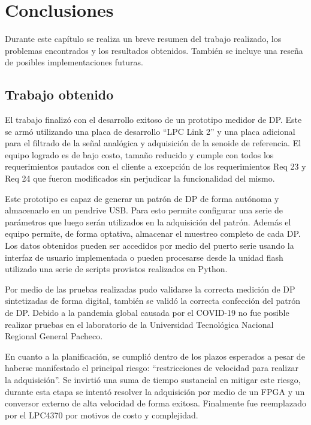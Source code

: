 
\chapter{Conclusiones} %

\label{Chapter5} %
Durante este capítulo se realiza un breve resumen del trabajo realizado, los problemas encontrados y los resultados obtenidos. También se incluye una reseña de posibles implementaciones futuras.

\section{Trabajo obtenido}

El trabajo finalizó con el desarrollo exitoso de un prototipo medidor de DP. Este se armó utilizando una placa de desarrollo “LPC Link 2” y una placa adicional para el filtrado de la señal analógica y adquisición de la senoide de referencia. El equipo logrado es de bajo costo, tamaño reducido y cumple con todos los requerimientos pautados con el cliente a excepción de los requerimientos Req 23 y Req 24 que fueron modificados sin perjudicar la funcionalidad del mismo.

Este prototipo es capaz de generar un patrón de DP de forma autónoma y almacenarlo en un pendrive USB. Para esto permite configurar una serie de parámetros que luego serán utilizados en la adquisición del patrón. Además el equipo permite, de forma optativa, almacenar el muestreo completo de cada DP. Los datos obtenidos pueden ser accedidos por medio del puerto serie usando la interfaz de usuario implementada o pueden procesarse desde la unidad flash utilizado una serie de scripts provistos realizados en Python.

Por medio de las pruebas realizadas pudo validarse la correcta medición de DP sintetizadas de forma digital, también se validó la correcta confección del patrón de DP. Debido a la pandemia global causada por el COVID-19 no fue posible realizar pruebas en el laboratorio de la Universidad Tecnológica Nacional Regional General Pacheco.

En cuanto a la planificación, se cumplió dentro de los plazos esperados a pesar de haberse manifestado el principal riesgo: “restricciones de velocidad para realizar la adquisición”. Se invirtió una suma de tiempo sustancial en mitigar este riesgo, durante esta etapa se intentó resolver la adquisición por medio de un FPGA y un conversor externo de alta velocidad de forma exitosa. Finalmente fue reemplazado por el LPC4370 por motivos de costo y complejidad.

